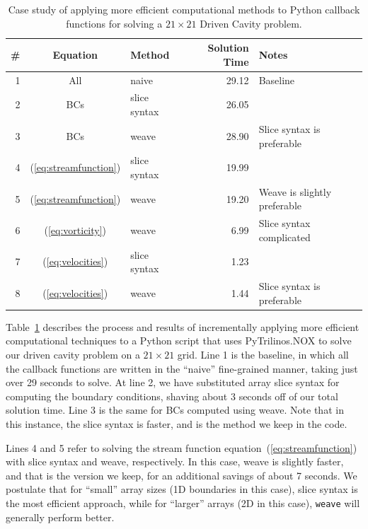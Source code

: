 \documentclass[acmtocl]{acmtrans2m}
\begin{document}
\begin{table}
  \begin{center}
    \begin{tabular}{| r | c | l | r | l |}
      \hline
      \# & Equation                 & Method       & Solution Time & Notes \\
      \hline
      1 & All                       & naive        & 29.12 & Baseline \\
      2 & BCs                       & slice syntax & 26.05 & \\
      3 & BCs                       & weave        & 28.90 & Slice syntax is preferable \\
      4 & (\ref{eq:streamfunction}) & slice syntax & 19.99 & \\
      5 & (\ref{eq:streamfunction}) & weave        & 19.20 & Weave is slightly preferable \\
      6 & (\ref{eq:vorticity})      & weave        &  6.99 & Slice syntax complicated \\
      7 & (\ref{eq:velocities})     & slice syntax &  1.23 & \\
      8 & (\ref{eq:velocities})     & weave        &  1.44 & Slice syntax is preferable \\
      \hline
    \end{tabular}
    \caption{Case study of applying more efficient computational
      methods to Python callback functions for solving a $21\times21$
      Driven Cavity problem.}
    \label{tab:callbacks}
  \end{center}
\end{table}

Table~\ref{tab:callbacks} describes the process and results of
incrementally applying more efficient computational techniques to a
Python script that uses PyTrilinos.NOX to solve our driven cavity
problem on a $21\times21$ grid.  Line 1 is the baseline, in which all
the callback functions are written in the ``naive'' fine-grained
manner, taking just over 29 seconds to solve.  At line 2, we have
substituted array slice syntax for computing the boundary conditions,
shaving about 3 seconds off of our total solution time.  Line 3 is the
same for BCs computed using weave.  Note that in this instance, the
slice syntax is faster, and is the method we keep in the code.

Lines 4 and 5 refer to solving the stream function
equation~(\ref{eq:streamfunction}) with slice syntax and weave,
respectively.  In this case, weave is slightly faster, and that is the
version we keep, for an additional savings of about 7 seconds.  We
postulate that for ``small'' array sizes (1D boundaries in this case),
slice syntax is the most efficient approach, while for ``larger''
arrays (2D in this case), {\tt weave} will generally perform better.
\end{document}
